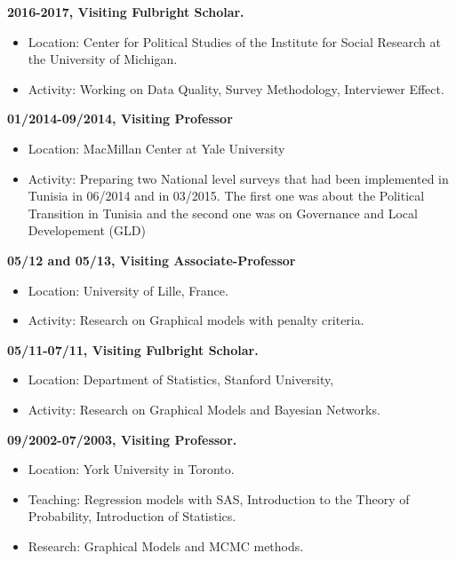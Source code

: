 \documentclass[]{article}
\begin{document}
\textbf{2016-2017, Visiting Fulbright Scholar.}

\begin{itemize}
\item
  Location: Center for Political Studies of the Institute for Social
  Research at the University of Michigan.
\item
  Activity: Working on Data Quality, Survey Methodology, Interviewer
  Effect.
\end{itemize}

\textbf{01/2014-09/2014, Visiting Professor}

\begin{itemize}
\item
  Location: MacMillan Center at Yale University
\item
  Activity: Preparing two National level surveys that had been
  implemented in Tunisia in 06/2014 and in 03/2015. The first one was
  about the Political Transition in Tunisia and the second one was on
  Governance and Local Developement (GLD)
\end{itemize}

\textbf{05/12 and 05/13, Visiting Associate-Professor}

\begin{itemize}
\item
  Location: University of Lille, France.
\item
  Activity: Research on Graphical models with penalty criteria.
\end{itemize}

\textbf{05/11-07/11, Visiting Fulbright Scholar.}

\begin{itemize}
\item
  Location: Department of Statistics, Stanford University,
\item
  Activity: Research on Graphical Models and Bayesian Networks.
\end{itemize}

\textbf{09/2002-07/2003, Visiting Professor.}

\begin{itemize}
\item
  Location: York University in Toronto.
\item
  Teaching: Regression models with SAS, Introduction to the Theory of
  Probability, Introduction of Statistics.
\item
  Research: Graphical Models and MCMC methods.
\end{itemize}
\end{document}
